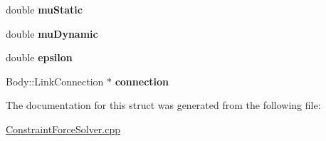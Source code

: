 \begin{DoxyCompactItemize}
\item 
\hypertarget{structOpenHRP_1_1CFSImpl_1_1LinkPair_a60f150ec293f131398a0b52deb3fea9f}{double {\bfseries mu\-Static}}\label{structOpenHRP_1_1CFSImpl_1_1LinkPair_a60f150ec293f131398a0b52deb3fea9f}

\item 
\hypertarget{structOpenHRP_1_1CFSImpl_1_1LinkPair_ad3972cddecc181e32ff54fd09d578666}{double {\bfseries mu\-Dynamic}}\label{structOpenHRP_1_1CFSImpl_1_1LinkPair_ad3972cddecc181e32ff54fd09d578666}

\item 
\hypertarget{structOpenHRP_1_1CFSImpl_1_1LinkPair_a2615eb6ee9e7492c168ae2062c6dd491}{double {\bfseries epsilon}}\label{structOpenHRP_1_1CFSImpl_1_1LinkPair_a2615eb6ee9e7492c168ae2062c6dd491}

\item 
\hypertarget{structOpenHRP_1_1CFSImpl_1_1LinkPair_a9f492145d36dacfb16dc202420c44ed7}{Body\-::\-Link\-Connection $\ast$ {\bfseries connection}}\label{structOpenHRP_1_1CFSImpl_1_1LinkPair_a9f492145d36dacfb16dc202420c44ed7}

\end{DoxyCompactItemize}


The documentation for this struct was generated from the following file\-:\begin{DoxyCompactItemize}
\item 
\hyperlink{ConstraintForceSolver_8cpp}{Constraint\-Force\-Solver.\-cpp}\end{DoxyCompactItemize}
